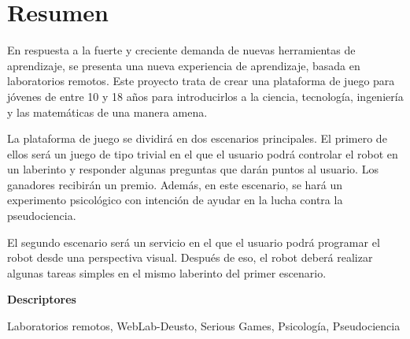 \chapter*{Resumen}

En respuesta a la fuerte y creciente demanda de nuevas herramientas de aprendizaje, se presenta una
nueva experiencia de aprendizaje, basada en laboratorios remotos. Este proyecto trata de crear una
plataforma de juego para jóvenes de entre 10 y 18 años para introducirlos a la ciencia, tecnología,
ingeniería y las matemáticas de una manera amena.

La plataforma de juego se dividirá en dos escenarios principales. El primero de ellos será un juego
de tipo trivial en el que el usuario podrá controlar el robot en un laberinto y responder algunas
preguntas que darán puntos al usuario. Los ganadores recibirán un premio. Además, en este escenario,
se hará un experimento psicológico con intención de ayudar en la lucha contra la pseudociencia.

El segundo escenario será un servicio en el que el usuario podrá programar el robot desde una
perspectiva visual. Después de eso, el robot deberá realizar algunas tareas simples en el mismo
laberinto del primer escenario.

\vspace{2em}

{\Large\bfseries\sffamily Descriptores}
\vspace{3\medskipamount}

Laboratorios remotos, WebLab-Deusto, Serious Games, Psicología, Pseudociencia
